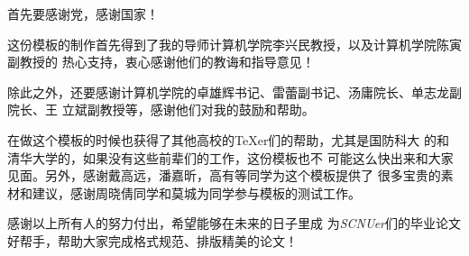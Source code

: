 
\begin{ack}

  首先要感谢党，感谢国家！
  
  这份模板的制作首先得到了我的导师计算机学院李兴民教授，以及计算机学院陈寅副教授的
  热心支持，衷心感谢他们的教诲和指导意见！

  除此之外，还要感谢计算机学院的卓雄辉书记、雷蕾副书记、汤庸院长、单志龙副院长、王
  立斌副教授等，感谢他们对我的鼓励和帮助。

  在做这个模板的时候也获得了其他高校的\TeX{}er们的帮助，尤其是国防科大
  的\nudtpaper{}和清华大学的\thuthesis{}，如果没有这些前辈们的工作，这份模板也不
  可能这么快出来和大家见面。另外，感谢戴高远，潘嘉昕，高有等同学为这个模板提供了
  很多宝贵的素材和建议，感谢周晓倩同学和莫城为同学参与模板的测试工作。

  感谢以上所有人的努力付出，希望\scnuthesis{}能够在未来的日子里成
  为\textit{SCNUer}们的毕业论文好帮手，帮助大家完成格式规范、排版精美的论文！

\end{ack}
